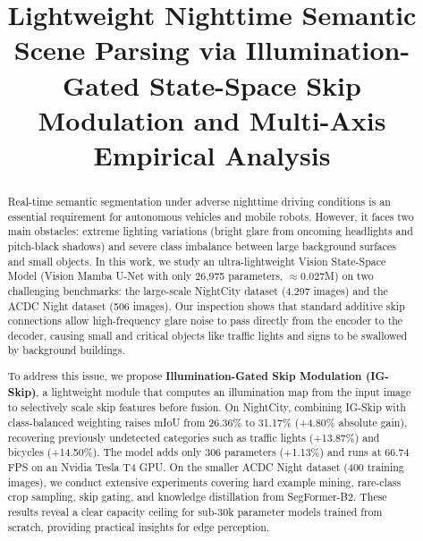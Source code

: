 \documentclass[conference]{IEEEtran}
\begin{document}
\title{Lightweight Nighttime Semantic Scene Parsing via Illumination-Gated State-Space Skip Modulation and Multi-Axis Empirical Analysis}

\author{
\and
{}
}

\maketitle

\begin{abstract}
Real-time semantic segmentation under adverse nighttime driving conditions is an essential requirement for autonomous vehicles and mobile robots. However, it faces two main obstacles: extreme lighting variations (bright glare from oncoming headlights and pitch-black shadows) and severe class imbalance between large background surfaces and small objects. In this work, we study an ultra-lightweight Vision State-Space Model (Vision Mamba U-Net with only 26,975 parameters, $\approx$0.027M) on two challenging benchmarks: the large-scale NightCity dataset (4,297 images) and the ACDC Night dataset (506 images). Our inspection shows that standard additive skip connections allow high-frequency glare noise to pass directly from the encoder to the decoder, causing small and critical objects like traffic lights and signs to be swallowed by background buildings.

To address this issue, we propose \textbf{Illumination-Gated Skip Modulation (IG-Skip)}, a lightweight module that computes an illumination map from the input image to selectively scale skip features before fusion. On NightCity, combining IG-Skip with class-balanced weighting raises mIoU from 26.36\% to 31.17\% (+4.80\% absolute gain), recovering previously undetected categories such as traffic lights (+13.87\%) and bicycles (+14.50\%). The model adds only 306 parameters (+1.13\%) and runs at 66.74 FPS on an Nvidia Tesla T4 GPU. On the smaller ACDC Night dataset (400 training images), we conduct extensive experiments covering hard example mining, rare-class crop sampling, skip gating, and knowledge distillation from SegFormer-B2. These results reveal a clear capacity ceiling for sub-30k parameter models trained from scratch, providing practical insights for edge perception.
\end{abstract}
\end{document}
